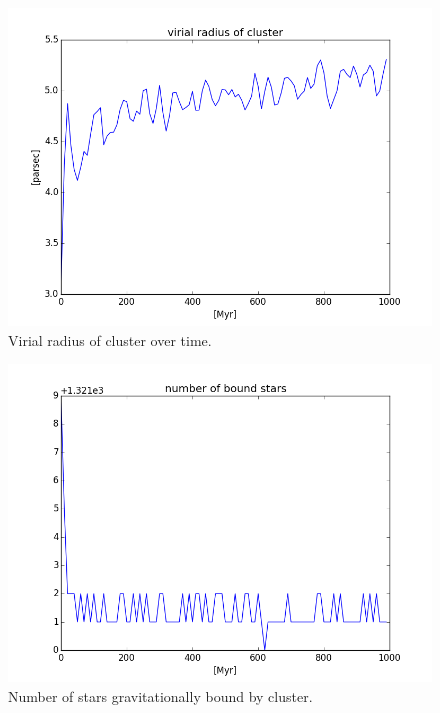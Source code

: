 \documentclass{aa}
\begin{document}
\begin{figure}
    \centering
    \includegraphics[width=\hsize]{img/cluster_virial_radius.png}
    \caption{Virial radius of cluster over time.}\label{fig:virial_radius}
\end{figure}

\begin{figure}
    \centering
    \includegraphics[width=\hsize]{img/bound_stars.png}
    \caption{Number of stars gravitationally bound by cluster.}\label{fig:bound_stars}
\end{figure}
\end{document}
